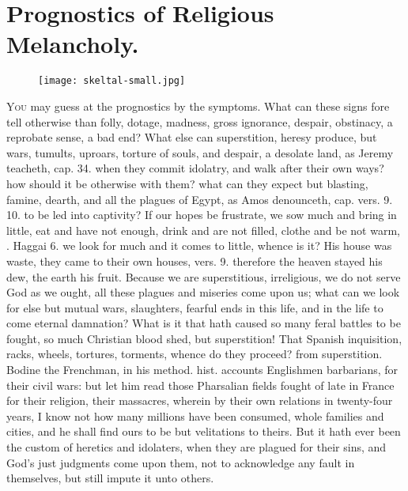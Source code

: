 {\section{Prognostics of Religious Melancholy.}
\begin{figure}[H]
  \begingroup
  \centering
  \texttt{[image: skeltal-small.jpg]}
  \label{fig:skeltal}
\end{figure}
\lettrine{Y}{ou} may guess at the prognostics by the symptoms. What can these signs
fore tell otherwise than folly, dotage, madness, gross ignorance,
despair, obstinacy, a reprobate sense, a bad end? What else can
superstition, heresy produce, but wars, tumults, uproars, torture of
souls, and despair, a desolate land, as Jeremy teacheth, cap.  34.
when they commit idolatry, and walk after their own ways? how should it
be otherwise with them? what can they expect but blasting, famine,
dearth, and all the plagues of Egypt, as Amos denounceth, cap. 
vers. 9. 10. to be led into captivity? If our hopes be frustrate, we
sow much and bring in little, eat and have not enough, drink and are
not filled, clothe and be not warm, \etc{}. Haggai  6. we look for much
and it comes to little, whence is it? His house was waste, they came to
their own houses, vers. 9. therefore the heaven stayed his dew, the
earth his fruit. Because we are superstitious, irreligious, we do not
serve God as we ought, all these plagues and miseries come upon us;
what can we look for else but mutual wars, slaughters, fearful ends in
this life, and in the life to come eternal damnation? What is it that
hath caused so many feral battles to be fought, so much Christian blood
shed, but superstition! That Spanish inquisition, racks, wheels,
tortures, torments, whence do they proceed? from superstition. Bodine
the Frenchman, in his method. hist. accounts Englishmen
barbarians, for their civil wars: but let him read those Pharsalian
fields fought of late in France for their religion, their
massacres, wherein by their own relations in twenty-four years, I know
not how many millions have been consumed, whole families and cities,
and he shall find ours to be but velitations to theirs. But it hath
ever been the custom of heretics and idolaters, when they are plagued
for their sins, and God's just judgments come upon them, not to
acknowledge any fault in themselves, but still impute it unto others.

}
